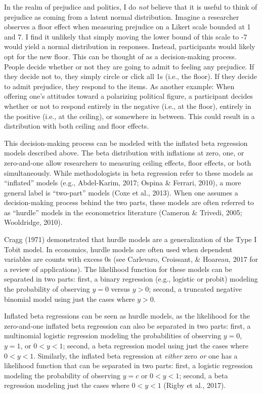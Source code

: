 \documentclass[english,,man]{apa6}
\begin{document}
In the realm of prejudice and politics, I do \emph{not} believe that it is useful to think of prejudice as coming from a latent normal distribution. Imagine a researcher observes a floor effect when measuring prejudice on a Likert scale bounded at 1 and 7. I find it unlikely that simply moving the lower bound of this scale to -7 would yield a normal distribution in responses. Instead, participants would likely opt for the new floor. This can be thought of as a decision-making process. People decide whether or not they are going to admit to feeling any prejudice. If they decide not to, they simply circle or click all 1s (i.e., the floor). If they decide to admit prejudice, they respond to the items. As another example: When offering one's attitudes toward a polarizing political figure, a participant decides whether or not to respond entirely in the negative (i.e., at the floor), entirely in the positive (i.e., at the ceiling), or somewhere in between. This could result in a distribution with both ceiling and floor effects.

This decision-making process can be modeled with the inflated beta regression models described above. The beta distribution with inflations at zero, one, or zero-and-one allow researchers to measuring ceiling effects, floor effects, or both simultaneously. While methodologists in beta regression refer to these models as \enquote{inflated} models (e.g., Abdel-Karim, 2017; Ospina \& Ferrari, 2010), a more general label is \enquote{two-part} models (Coxe et al., 2013). When one assumes a decision-making process behind the two parts, these models are often referred to as \enquote{hurdle} models in the econometrics literature (Cameron \& Trivedi, 2005; Wooldridge, 2010).

Cragg (1971) demonstrated that hurdle models are a generalization of the Type I Tobit model. In economics, hurdle models are often used when dependent variables are counts with excess 0s (see Carlevaro, Croissant, \& Hoareau, 2017 for a review of applications). The likelihood function for these models can be separated in two parts: first, a binary regression (e.g., logistic or probit) modeling the probability of observing \(y = 0\) versus \(y > 0\); second, a truncated negative binomial model using just the cases where \(y > 0\).

Inflated beta regressions can be seen as hurdle models, as the likelihood for the zero-and-one inflated beta regression can also be separated in two parts: first, a multinomial logistic regression modeling the probabilities of observing \(y = 0\), \(y = 1\), or \(0 < y < 1\); second, a beta regression model using just the cases where \(0 < y < 1\). Similarly, the inflated beta regression at \emph{either} zero \emph{or} one has a likelihood function that can be separated in two parts: first, a logistic regression modeling the probability of observing \(y = c\) or \(0 < y < 1\); second, a beta regression modeling just the cases where \(0 < y < 1\) (Rigby et al., 2017).
\end{document}
